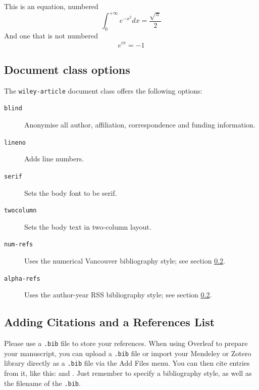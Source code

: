 \documentclass[num-refs]{wiley-article}
\begin{document}
This is an equation, numbered
\begin{equation}
\int_0^{+\infty}e^{-x^2}dx=\frac{\sqrt{\pi}}{2}
\end{equation}
And one that is not numbered
\begin{equation*}
e^{i\pi}=-1
\end{equation*}

\subsection{Document class options}

The \texttt{wiley-article} document class offers the following options:

\begin{description}
\item[\texttt{blind}] Anonymise all author, affiliation, correspondence
       and funding information.

\item[\texttt{lineno}] Adds line numbers.

\item[\texttt{serif}] Sets the body font to be serif.

\item[\texttt{twocolumn}] Sets the body text in two-column layout.

\item[\texttt{num-refs}] Uses the numerical Vancouver bibliography style; see section \ref{sec:bibstyles}.

\item[\texttt{alpha-refs}] Uses the author-year RSS bibliography style; see section \ref{sec:bibstyles}.
\end{description}

\subsection{Adding Citations and a References List}
\label{sec:bibstyles}

Please use a \verb|.bib| file to store your references. When using Overleaf to prepare your manuscript, you can upload a \verb|.bib| file or import your Mendeley or Zotero library directly as a \verb|.bib| file via the Add Files menu. You can then cite entries from it, like this: \cite{urmson2008autonomous,lees2010theoretical} and \cite{geiger2012we}. Just remember to specify a bibliography style, as well as the filename of the \verb|.bib|.
\end{document}
